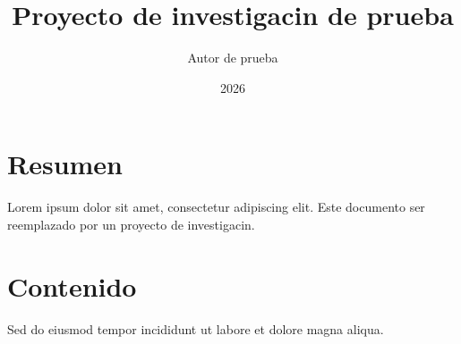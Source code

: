 ﻿\documentclass[12pt]{article}
\title{Proyecto de investigacin de prueba}
\author{Autor de prueba}
\date{2026}
\begin{document}
\maketitle

\section{Resumen}

Lorem ipsum dolor sit amet, consectetur adipiscing elit. Este documento
ser reemplazado por un proyecto de investigacin.

\section{Contenido}

Sed do eiusmod tempor incididunt ut labore et dolore magna aliqua.
\end{document}
